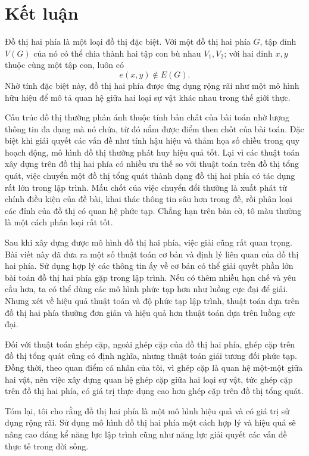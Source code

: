 \documentclass[11pt]{article}
\begin{document}
\section{Kết luận}

Đồ thị hai phía là một loại đồ thị đặc biệt. Với một đồ thị hai phía \(G\),
tập đỉnh \(V(G)\) của nó có thể chia thành hai tập con bù nhau \(V_1,V_2\);
với hai đỉnh \(x,y\) thuộc cùng một tập con, luôn có
\[
  e(x,y)\notin E(G).
\]
Nhờ tính đặc biệt này, đồ thị hai phía được ứng dụng rộng rãi như một mô hình
hữu hiệu để mô tả quan hệ giữa hai loại sự vật khác nhau trong thế giới thực.

Cấu trúc đồ thị thường phản ánh thuộc tính bản chất của bài toán nhờ lượng
thông tin đa dạng mà nó chứa, từ đó nắm được điểm then chốt của bài toán. Đặc
biệt khi giải quyết các vấn đề như tính hậu hiệu và thảm họa số chiều trong
quy hoạch động, mô hình đồ thị thường phát huy hiệu quả tốt. Lại vì các thuật
toán xây dựng trên đồ thị hai phía có nhiều ưu thế so với thuật toán trên đồ
thị tổng quát, việc chuyển một đồ thị tổng quát thành dạng đồ thị hai phía có
tác dụng rất lớn trong lập trình. Mấu chốt của việc chuyển đổi thường là
xuất phát từ chính điều kiện của đề bài, khai thác thông tin sâu hơn trong
đề, rồi phân loại các đỉnh của đồ thị có quan hệ phức tạp. Chẳng hạn trên
bàn cờ, tô màu thường là một cách phân loại rất tốt.

Sau khi xây dựng được mô hình đồ thị hai phía, việc giải cũng rất quan
trọng. Bài viết này đã đưa ra một số thuật toán cơ bản và định lý liên quan
của đồ thị hai phía. Sử dụng hợp lý các thông tin ấy về cơ bản có thể giải
quyết phần lớn bài toán đồ thị hai phía gặp trong lập trình. Nếu có thêm
nhiều hạn chế và yêu cầu hơn, ta có thể dùng các mô hình phức tạp hơn như
luồng cực đại để giải. Nhưng xét về hiệu quả thuật toán và độ phức tạp lập
trình, thuật toán dựa trên đồ thị hai phía thường đơn giản và hiệu quả hơn
thuật toán dựa trên luồng cực đại.

Đối với thuật toán ghép cặp, ngoài ghép cặp của đồ thị hai phía, ghép cặp
trên đồ thị tổng quát cũng có định nghĩa, nhưng thuật toán giải tương đối
phức tạp. Đồng thời, theo quan điểm cá nhân của tôi, vì ghép cặp là quan hệ
một-một giữa hai vật, nên việc xây dựng quan hệ ghép cặp giữa hai loại sự
vật, tức ghép cặp trên đồ thị hai phía, có giá trị thực dụng cao hơn ghép cặp
trên đồ thị tổng quát.

Tóm lại, tôi cho rằng đồ thị hai phía là một mô hình hiệu quả và có giá trị
sử dụng rộng rãi. Sử dụng mô hình đồ thị hai phía một cách hợp lý và hiệu quả
sẽ nâng cao đáng kể năng lực lập trình cũng như năng lực giải quyết các vấn
đề thực tế trong đời sống.
\end{document}
